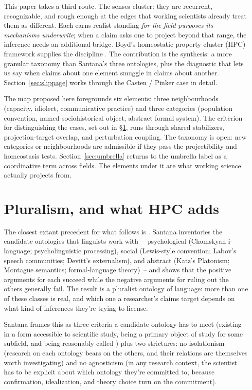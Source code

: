 \documentclass[12pt]{article}
\begin{document}
This paper takes a third route. The senses cluster: they are recurrent, recognizable, and rough enough at the edges that working scientists already treat them as different. Each earns realist standing \emph{for the field purposes its mechanisms underwrite}; when a claim asks one to project beyond that range, the inference needs an additional bridge. Boyd's homeostatic-property-cluster (HPC) framework supplies the discipline \citep{boyd1991, boyd1999}. The contribution is the synthesis: a more granular taxonomy than Santana's three ontologies, plus the diagnostic that lets us say when claims about one element smuggle in claims about another. Section~\ref{sec:slippage} works through the Casten / Pinker case in detail.

The map proposed here foregrounds six elements: three neighbourhoods (capacity, idiolect, communicative practice) and three categories (population convention, named sociohistorical object, abstract formal system). The criterion for distinguishing the cases, set out in §\ref{sec:pluralism}, runs through shared stabilizers, projection-target overlap, and perturbation coupling. The taxonomy is open: new categories or neighbourhoods are admissible if they pass the projectibility and homeostasis tests. Section~\ref{sec:umbrella} returns to the umbrella label  as a coordinative term across fields. The elements under it are what working science actually projects from.

\section{Pluralism, and what HPC adds}\label{sec:pluralism}

The closest extant precedent for what follows is \textcite{santana2016language}. Santana inventories the candidate ontologies that linguists work with~-- psychological (Chomskyan i-language; psycholinguistic processing), social (Lewis-style convention; Labov's speech communities; Devitt's externalism), and abstract (Katz's Platonism; Montague semantics; formal-language theory)~-- and shows that the positive arguments for each succeed while the negative arguments for ruling out the others generally fail. The result is a pluralist ontology of language: more than one of these classes is real, and which one a researcher's claims target depends on what kind of inferences they're trying to license.

Santana frames this as three criteria a candidate ontology has to meet (existing in a form accessible to scientific study, being a primary object of study for some subfield, and being reasonably called ) plus two strictures: no isolationism (research on each ontology bears on the others, and their relations are themselves worth investigating) and no agnosticism (in any research context, the scientist has to be explicit about which ontology they're committed to, because confirmation, idealization, and theory choice turn on the commitment).
\end{document}
